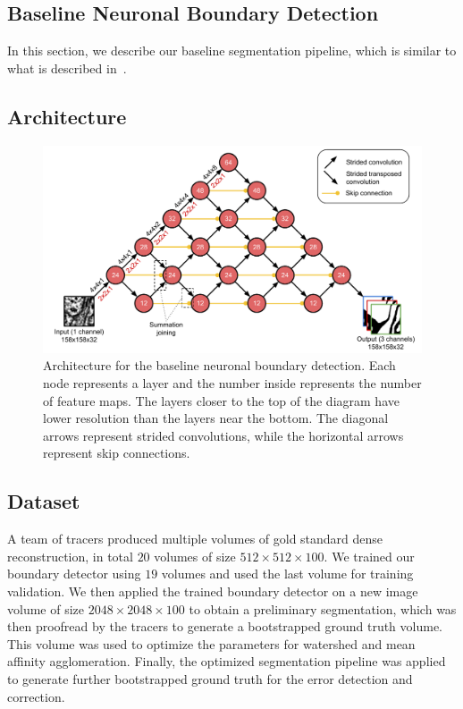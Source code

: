 \documentclass{article}
\begin{document}
\begin{appendices}

\section{Baseline Neuronal Boundary Detection}
\label{appendix:baseline}

In this section, we describe our baseline segmentation pipeline, which is similar to what is described in~\cite{kisuk}.

\subsection{Architecture}

\begin{figure}[!b]
\centering
\includegraphics[width=1.0\linewidth]{baseline.pdf}

\caption{Architecture for the baseline neuronal boundary detection. Each node represents a layer and the number inside represents the number of feature maps. The layers closer to the top of the diagram have lower resolution than the layers near the bottom. The diagonal arrows represent strided convolutions, while the horizontal arrows represent skip connections.}
\label{fig:architecture}
\end{figure}

\subsection{Dataset}
A team of tracers produced multiple volumes of gold standard dense reconstruction, in total $20$ volumes of size $512 \times 512 \times 100$. We trained our boundary detector using $19$ volumes and used the last volume for training validation. We then applied the trained boundary detector on a new image volume of size $2048 \times 2048 \times 100$ to obtain a preliminary segmentation, which was then proofread by the tracers to generate a bootstrapped ground truth volume. This volume was used to optimize the parameters for watershed and mean affinity agglomeration. Finally, the optimized segmentation pipeline was applied to generate further bootstrapped ground truth for the error detection and correction.


\end{appendices}
\end{document}
